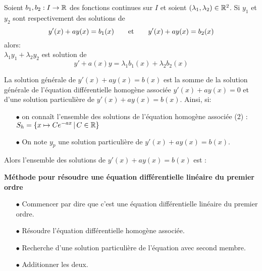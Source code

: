\documentclass[a4paper, 11pt]{article}
\begin{document}
\vsec


\begin{prop}
  Soient $ b_1, b_2: I\rightarrow \mathbb{R}$ des fonctions continues sur $I$ et soient $(\lambda_1,\lambda_2)\in\mathbb{R}^2$. Si $y_1$ et $y_2$ sont respectivement des solutions de
  $$y^{\prime}(x)+ay(x)=b_1(x)\qquad \hbox{et}\qquad y^{\prime}(x)+ay(x)=b_2(x)$$
  alors:\vsec\\
  $\lambda_1y_1+\lambda_2y_2$ est solution de $$y'+a(x)y = \lambda_1b_1(x)+\lambda_2b_2(x)$$
\end{prop}



\begin{theorem}
  La solution g\'en\'erale de $y'(x)+ay(x)=b(x)$ est la somme de la solution g\'en\'erale de l'\'equation diff\'erentielle homog\`ene associ\'ee  $y'(x)+ay(x)=0$ et d'une solution particuli\`ere de $y'(x)+ay(x)=b(x)$. Ainsi, si:
  \begin{itemize}
    \item[$\bullet$] on conna\^{i}t l'ensemble des solutions de l'\'equation homog\`ene associ\'ee (2) : $S_h=\{ x\mapsto C e^{-ax}\, |\, C\in \mathbb{R}\}$
    \item[$\bullet$] On note $y_p$ une solution particuli\`ere de $y'(x)+ay(x)=b(x)$.
  \end{itemize}
  \vsec
  Alors l'ensemble des solutions de $y'(x)+ay(x)=b(x)$ est :
\end{theorem}



\begin{minipage}{0.9\textwidth}
  \begin{tcolorbox}[{colback=red!5!white,colframe=red!75!black}]
    \textbf{M\'ethode pour r\'esoudre une \'equation diff\'erentielle lin\'eaire du premier ordre}
    \begin{itemize}
      \item[$\bullet$] Commencer par dire que c'est une \'equation diff\'erentielle lin\'eaire du premier ordre.
      \item[$\bullet$] R\'esoudre l'\'equation diff\'erentielle homog\`ene associ\'ee.
      \item[$\bullet$] Recherche d'une solution particuli\`ere de l'\'equation avec second membre.
      \item[$\bullet$] Additionner les deux.
    \end{itemize}
  \end{tcolorbox}
\end{minipage}
\end{document}
